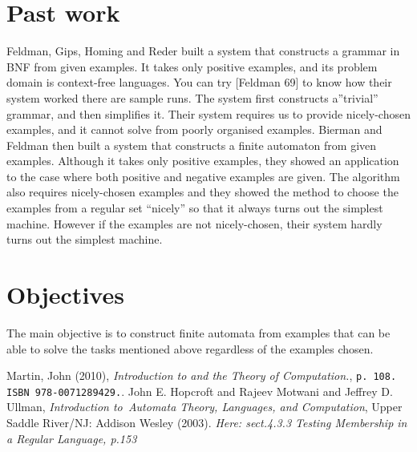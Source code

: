 \documentclass[14pt]{article}
\begin{document}
\section{Past work}
Feldman, Gips, Homing and Reder built a system that constructs a grammar in BNF from given examples. It takes only positive examples, and its problem domain is context-free languages.
You can try [Feldman 69] to know how their system worked there are sample runs.
The system first constructs a”trivial” grammar, and then simplifies it. Their system requires us to provide nicely-chosen examples, and it cannot solve from poorly organised examples.
Bierman and Feldman then built a system that constructs a finite automaton from given examples. Although it takes only positive examples, they showed an application to the case where both positive and negative examples are given. The algorithm also requires nicely-chosen examples and they showed the method to choose the examples from a regular set “nicely” so that it always turns out the simplest machine. However if the examples are not nicely-chosen, their system hardly turns out the simplest machine.
\section{Objectives}
The main objective is to construct finite automata from examples that can be able to solve the tasks mentioned above regardless of the examples chosen.
\begin{thebibliography}{10} 
 Martin, John (2010), 
\emph{Introduction to \Languages and the Theory of Computation.}, \texttt{p. 108. ISBN 978-0071289429.}. 
 John E. Hopcroft and Rajeev Motwani and Jeffrey D. Ullman, 
\emph{Introduction to\ Automata Theory, Languages, and Computation}, Upper Saddle River/NJ: Addison Wesley (2003).
\emph{Here: sect.4.3.3 Testing Membership in a Regular Language, p.153} 
\end{thebibliography}
\end{document}
